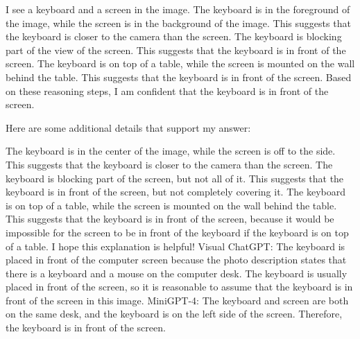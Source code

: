 \begin{enumerate}
    I see a keyboard and a screen in the image.
    The keyboard is in the foreground of the image, while the screen is in the background of the image. This suggests that the keyboard is closer to the camera than the screen.
    The keyboard is blocking part of the view of the screen. This suggests that the keyboard is in front of the screen.
    The keyboard is on top of a table, while the screen is mounted on the wall behind the table. This suggests that the keyboard is in front of the screen.
    Based on these reasoning steps, I am confident that the keyboard is in front of the screen.
    
    Here are some additional details that support my answer:
    
    The keyboard is in the center of the image, while the screen is off to the side. This suggests that the keyboard is closer to the camera than the screen.
    The keyboard is blocking part of the screen, but not all of it. This suggests that the keyboard is in front of the screen, but not completely covering it.
    The keyboard is on top of a table, while the screen is mounted on the wall behind the table. This suggests that the keyboard is in front of the screen, because it would be impossible for the screen to be in front of the keyboard if the keyboard is on top of a table.
    I hope this explanation is helpful!
    \subitem Visual ChatGPT: The keyboard is placed in front of the computer screen because the photo description states that there is a keyboard and a mouse on the computer desk. The keyboard is usually placed in front of the screen, so it is reasonable to assume that the keyboard is in front of the screen in this image.
    \subitem MiniGPT-4: The keyboard and screen are both on the same desk, and the keyboard is on the left side of the screen. Therefore, the keyboard is in front of the screen.
\end{enumerate}
